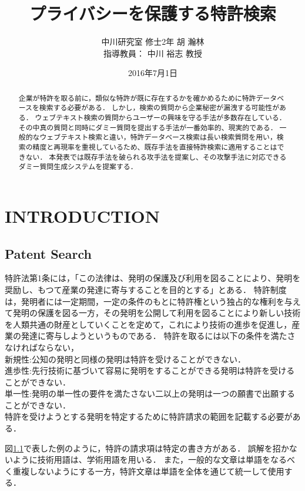 \documentclass{jsarticle}
\title{プライバシーを保護する特許検索}
\author{中川研究室 修士2年 胡 瀚林\\指導教員： 中川 裕志 教授}
\date{2016年7月1日}
\theoremstyle{definition}
\begin{document}
\maketitle
\begin{abstract}
企業が特許を取る前に，類似な特許が既に存在するかを確かめるために特許データベースを検索する必要がある．
しかし，検索の質問から企業秘密が漏洩する可能性がある．
ウェブテキスト検索の質問からユーザーの興味を守る手法が多数存在している．
その中真の質問と同時にダミー質問を提出する手法が一番効率的、現実的である．
一般的なウェブテキスト検索と違い，特許データベース検索は長い検索質問を用い，検索の精度と再現率を重視しているため、既存手法を直接特許検索に適用することはできない．
本発表では既存手法を破られる攻手法を提案し、その攻撃手法に対応できるダミー質問生成システムを提案する．
\end{abstract}


\section{INTRODUCTION}


\subsection{Patent Search}
特許法第1条には，「この法律は、発明の保護及び利用を図ることにより、発明を奨励し、もつて産業の発達に寄与することを目的とする」とある．\cite{}
特許制度は，発明者には一定期間，一定の条件のもとに特許権という独占的な権利を与えて発明の保護を図る一方，その発明を公開して利用を図ることにより新しい技術を人類共通の財産としていくことを定めて，これにより技術の進歩を促進し，産業の発達に寄与しようというものである．\cite{}
特許を取るには以下の条件を満たさなければならない，\\
新規性:公知の発明と同様の発明は特許を受けることができない．\\
進歩性:先行技術に基づいて容易に発明をすることができる発明は特許を受けることができない．\\
単一性:発明の単一性の要件を満たさない二以上の発明は一つの願書で出願することができない．\\

特許を受けようとする発明を特定するために特許請求の範囲を記載する必要がある．

図\ref{}で表した例のように，特許の請求項は特定の書き方がある．
誤解を招かないように技術用語は、学術用語を用いる．
また，一般的な文章は単語をなるべく重複しないようにする一方，特許文章は単語を全体を通じて統一して使用する．
\end{document}
